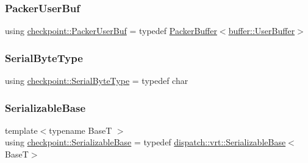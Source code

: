 \mbox{\label{namespacecheckpoint_a72c31e3d94e3b4d05bca5972bacc536a}} 
\subsubsection{\texorpdfstring{Packer\+User\+Buf}{PackerUserBuf}}
{\footnotesize\ttfamily using \hyperlink{namespacecheckpoint_a72c31e3d94e3b4d05bca5972bacc536a}{checkpoint\+::\+Packer\+User\+Buf} = typedef \hyperlink{structcheckpoint_1_1_packer_buffer}{Packer\+Buffer}$<$\hyperlink{structcheckpoint_1_1buffer_1_1_user_buffer}{buffer\+::\+User\+Buffer}$>$}

\mbox{\label{namespacecheckpoint_ae57f01cdc0b81776c23b6c7c934c58f5}} 
\subsubsection{\texorpdfstring{Serial\+Byte\+Type}{SerialByteType}}
{\footnotesize\ttfamily using \hyperlink{namespacecheckpoint_ae57f01cdc0b81776c23b6c7c934c58f5}{checkpoint\+::\+Serial\+Byte\+Type} = typedef char}

\mbox{\label{namespacecheckpoint_ae8adefa66d7575697f8e465bed48e3cc}} 
\subsubsection{\texorpdfstring{Serializable\+Base}{SerializableBase}}
{\footnotesize\ttfamily template$<$typename BaseT $>$ \\
using \hyperlink{namespacecheckpoint_ae8adefa66d7575697f8e465bed48e3cc}{checkpoint\+::\+Serializable\+Base} = typedef \hyperlink{structcheckpoint_1_1dispatch_1_1vrt_1_1_serializable_base}{dispatch\+::vrt\+::\+Serializable\+Base}$<$BaseT$>$}

\mbox{\label{namespacecheckpoint_a9c4afb2c8d1bc1f58b9e158d64331d65}} 
